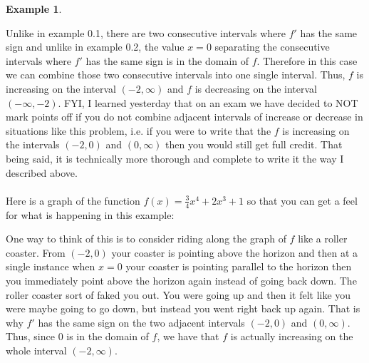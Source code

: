 \documentclass[reqno,psamsfonts]{amsart}
\theoremstyle{definition}
\newtheorem{exmp}[thm]{Example}
\theoremstyle{remark}
\numberwithin{equation}{section}
\begin{document}
\begin{exmp}
\begin{center}
\end{center}
Unlike in example 0.1, there are two consecutive intervals where $f'$ has the same sign and unlike in example 0.2, the value $x=0$ separating the consecutive intervals where $f'$ has the same sign is in the domain of $f$. Therefore in this case we can combine those two consecutive intervals into one single interval. Thus, $f$ is increasing on the interval $(-2,\infty)$ and $f$ is decreasing on the interval $(-\infty, -2)$. FYI, I learned yesterday that on an exam we have decided to NOT mark points off if you do not combine adjacent intervals of increase or decrease in situations like this problem, i.e. if you were to write that the $f$ is increasing on the intervals $(-2,0)$ and $(0,\infty)$ then you would still get full credit. That being said, it is technically more thorough and complete to write it the way I described above. 
\\
\\Here is a graph of the function $f(x) = \frac{3}{4}x^4+2x^3+1$ so that you can get a feel for what is happening in this example:
\begin{center}
\end{center}
One way to think of this is to consider riding along the graph of $f$ like a roller coaster. From $(-2,0)$ your coaster is pointing above the horizon and then at a single instance when $x=0$ your coaster is pointing parallel to the horizon then you immediately point above the horizon again instead of going back down. The roller coaster sort of faked you out. You were going up and then it felt like you were maybe going to go down, but instead you went right back up again. That is why $f'$ has the same sign on the two adjacent intervals $(-2,0)$ and $(0,\infty)$. Thus, since $0$ is in the domain of $f$, we have that $f$ is actually increasing on the whole interval $(-2,\infty)$. 
\end{exmp}
\end{document}
